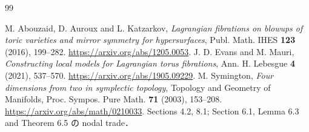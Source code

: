 \documentclass[11pt,a4paper]{article}
\theoremstyle{definition}
\begin{document}
\begin{thebibliography}{99}

M. Abouzaid, D. Auroux and L. Katzarkov,
\emph{Lagrangian fibrations on blowups of toric varieties and mirror symmetry for hypersurfaces},
Publ. Math. IHES \textbf{123} (2016), 199--282.
\url{https://arxiv.org/abs/1205.0053}.
J. D. Evans and M. Mauri,
\emph{Constructing local models for Lagrangian torus fibrations},
Ann. H. Lebesgue \textbf{4} (2021), 537--570.
\url{https://arxiv.org/abs/1905.09229}.
M. Symington,
\emph{Four dimensions from two in symplectic topology},
Topology and Geometry of Manifolds, Proc. Sympos. Pure Math. \textbf{71} (2003), 153--208.
\url{https://arxiv.org/abs/math/0210033}.
Sections 4.2, 8.1; Section 6.1, Lemma 6.3 and Theorem 6.5 の nodal trade．
\end{thebibliography}
\end{document}
